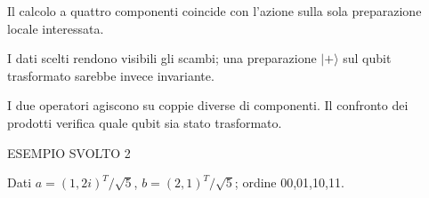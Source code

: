 Il calcolo a quattro componenti coincide con l'azione sulla sola preparazione locale interessata.\par


\label{c2-porte-locali-example-1-step-6}


I dati scelti rendono visibili gli scambi; una preparazione \(|+\rangle \) sul qubit trasformato sarebbe invece invariante.\par



I due operatori agiscono su coppie diverse di componenti. Il confronto dei prodotti verifica quale qubit sia stato trasformato.\par


\Needspace{.36\textheight}\label{c2-porte-locali-example-2}
{\sffamily\small\color{Accent} ESEMPIO SVOLTO 2\par}
Dati \(a=(1{,}2i)^{T}/\sqrt{5}\), \(b=(2{,}1)^{T}/\sqrt{5}\); ordine 00,01,10,11.\par


